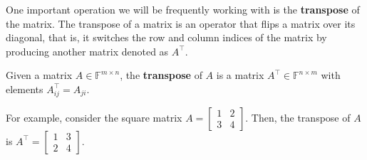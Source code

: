 \documentclass[../lecture-notes-148x210.tex]{subfiles}
\begin{document}
One important operation we will be frequently working with is the \textbf{transpose} of the matrix. The transpose of a matrix is an operator that flips a matrix over its diagonal, that is, it switches the row and column indices of the matrix by producing another matrix denoted as $A^{\top}$.

\begin{definition}[Transposition]
    Given a matrix $A \in \mathbb{F}^{m \times n}$, the \textbf{transpose} of $A$ is a matrix $A^{\top} \in \mathbb{F}^{n \times m}$ with elements $A^{\top}_{ij} = A_{ji}$.
\end{definition}

\begin{example}
    For example, consider the square matrix $A = \begin{bmatrix} 1 & 2 \\ 3 & 4 \end{bmatrix}$. 
    Then, the transpose of $A$ is $A^{\top} = \begin{bmatrix} 1 & 3 \\ 2 & 4 \end{bmatrix}$. 
\end{example}
\end{document}
